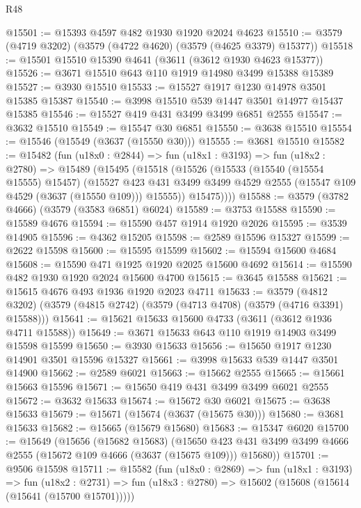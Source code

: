 \begin{lexlean}{R48}
\begin{coremodule}
@15501 := @15393 @4597 @482 @1930 @1920 @2024 @4623
@15510 := @3579 (@4719 @3202) (@3579 (@4722 @4620) (@3579 (@4625 @3379) @15377))
@15518 := @15501 @15510 @15390 @4641 (@3611 (@3612 @1930 @4623 @15377))
@15526 := @3671 @15510 @643 @110 @1919 @14980 @3499 @15388 @15389
@15527 := @3930 @15510
@15533 := @15527 @1917 @1230 @14978 @3501 @15385 @15387
@15540 := @3998 @15510 @539 @1447 @3501 @14977 @15437 @15385
@15546 := @15527 @419 @431 @3499 @3499 @6851 @2555
@15547 := @3632 @15510
@15549 := @15547 @30 @6851
@15550 := @3638 @15510
@15554 := @15546 (@15549 (@3637 (@15550 @30)))
@15555 := @3681 @15510
@15582 := @15482
    (fun (u18x0 : @2844) =>
    fun (u18x1 : @3193) =>
    fun (u18x2 : @2780) =>
    @15489
      (@15495
        (@15518
          (@15526
            (@15533
              (@15540 (@15554 @15555) @15457)
              (@15527
                @423
                @431
                @3499
                @3499
                @4529
                @2555
                (@15547 @109 @4529 (@3637 (@15550 @109)))
                @15555))
            @15475))))
@15588 := @3579 (@3782 @4666) (@3579 (@3583 @6851) @6024)
@15589 := @3753 @15588
@15590 := @15589 @4676
@15594 := @15590 @457 @1914 @1920 @2026
@15595 := @3539 @14905
@15596 := @4362 @15205
@15598 := @2589 @15596 @15327
@15599 := @2622 @15598
@15600 := @15595 @15599
@15602 := @15594 @15600 @4684
@15608 := @15590 @471 @1925 @1920 @2025 @15600 @4692
@15614 := @15590 @482 @1930 @1920 @2024 @15600 @4700
@15615 := @3645 @15588
@15621 := @15615 @4676 @493 @1936 @1920 @2023 @4711
@15633 := @3579
    (@4812 @3202)
    (@3579 (@4815 @2742) (@3579 (@4713 @4708) (@3579 (@4716 @3391) @15588)))
@15641 := @15621 @15633 @15600 @4733 (@3611 (@3612 @1936 @4711 @15588))
@15649 := @3671 @15633 @643 @110 @1919 @14903 @3499 @15598 @15599
@15650 := @3930 @15633
@15656 := @15650 @1917 @1230 @14901 @3501 @15596 @15327
@15661 := @3998 @15633 @539 @1447 @3501 @14900
@15662 := @2589 @6021
@15663 := @15662 @2555
@15665 := @15661 @15663 @15596
@15671 := @15650 @419 @431 @3499 @3499 @6021 @2555
@15672 := @3632 @15633
@15674 := @15672 @30 @6021
@15675 := @3638 @15633
@15679 := @15671 (@15674 (@3637 (@15675 @30)))
@15680 := @3681 @15633
@15682 := @15665 (@15679 @15680)
@15683 := @15347 @6020
@15700 := @15649
    (@15656
      (@15682 @15683)
      (@15650 @423 @431 @3499 @3499 @4666 @2555 (@15672 @109 @4666 (@3637 (@15675 @109))) @15680))
@15701 := @9506 @15598
@15711 := @15582
    (fun (u18x0 : @2869) =>
    fun (u18x1 : @3193) =>
    fun (u18x2 : @2731) => fun (u18x3 : @2780) => @15602 (@15608 (@15614 (@15641 (@15700 @15701)))))

\end{coremodule}
\end{lexlean}
